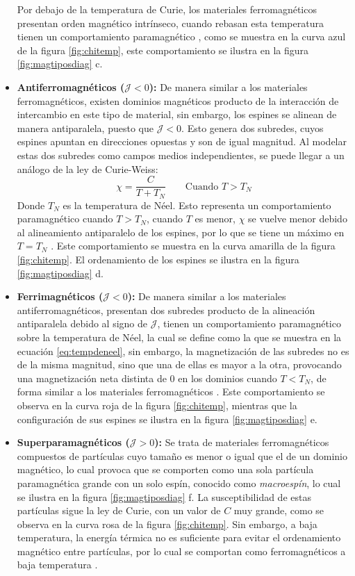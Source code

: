 \documentclass[../main.tex]{subfiles}
\begin{document}
\begin{itemize}
    Por debajo de la temperatura de Curie, los materiales ferromagnéticos presentan orden magnético intrínseco, cuando rebasan esta temperatura tienen un comportamiento paramagnético \cite{coey2010magnetism}, como se muestra en la curva azul de la figura \ref{fig:chitemp}, este comportamiento se ilustra en la figura \ref{fig:magtiposdiag} c.
    \item \textbf{Antiferromagnéticos ($\mathcal{J}<0$):} De manera similar a los materiales ferromagnéticos, existen dominios magnéticos producto de la interacción de intercambio en este tipo de material, sin embargo, los espines se alinean de manera antiparalela, puesto que $\mathcal{J}<0$. Esto genera dos subredes, cuyos espines apuntan en direcciones opuestas y son de igual magnitud. Al modelar estas dos subredes como campos medios independientes, se puede llegar a un análogo de la ley de Curie-Weiss:
    \begin{equation}
        \chi=\dfrac{C}{T+T_N}\qquad\text{Cuando }T>T_N
        \label{eq:tempdeneel}
    \end{equation}
    Donde $T_N$ es la temperatura de Néel. Esto representa un comportamiento paramagnético cuando $T>T_N$, cuando $T$ es menor, $\chi$ se vuelve menor debido al alineamiento antiparalelo de los espines, por lo que se tiene un máximo en $T=T_N$ \cite{coey2010magnetism}. Este comportamiento se muestra en la curva amarilla de la figura \ref{fig:chitemp}. El ordenamiento de los espines se ilustra en la figura \ref{fig:magtiposdiag} d.
    \item \textbf{Ferrimagnéticos ($\mathcal{J}<0$):} De manera similar a los materiales antiferromagnéticos, presentan dos subredes producto de la alineación antiparalela debido al signo de $\mathcal{J}$, tienen un comportamiento paramagnético sobre la temperatura de Néel, la cual se define como la que se muestra en la ecuación \ref{eq:tempdeneel}, sin embargo, la magnetización de las subredes no es de la misma magnitud, sino que una de ellas es mayor a la otra, provocando una magnetización neta distinta de 0 en los dominios cuando $T<T_N$, de forma similar a los materiales ferromagnéticos \cite{coey2010magnetism}. Este comportamiento se observa en la curva roja de la figura \ref{fig:chitemp}, mientras que la configuración de sus espines se ilustra en la figura \ref{fig:magtiposdiag} e.
    \item \textbf{Superparamagnéticos ($\mathcal{J}>0$):} Se trata de materiales ferromagnéticos compuestos de partículas cuyo tamaño es menor o igual que el de un dominio magnético, lo cual provoca que se comporten como una sola partícula paramagnética grande con un solo espín, conocido como \textit{macroespín}, lo cual se ilustra en la figura \ref{fig:magtiposdiag} f. La susceptibilidad de estas partículas sigue la ley de Curie, con un valor de $C$ muy grande, como se observa en la curva rosa de la figura \ref{fig:chitemp}. Sin embargo, a baja temperatura, la energía térmica no es suficiente para evitar el ordenamiento magnético entre partículas, por lo cual se comportan como ferromagnéticos a baja temperatura \cite{coey2010magnetism}.
\end{itemize}
\end{document}
